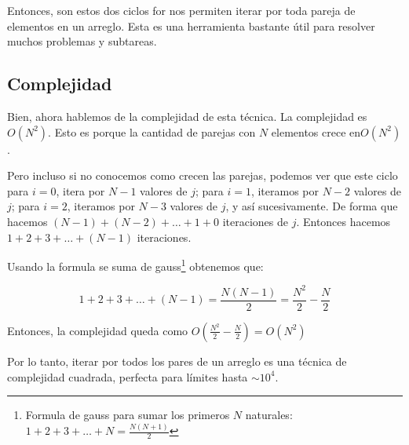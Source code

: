 Entonces, son estos dos ciclos for nos permiten iterar por toda pareja de elementos en un arreglo. Esta es una herramienta bastante útil para resolver muchos problemas y subtareas.

\subsection {Complejidad}
Bien, ahora hablemos de la complejidad de esta técnica. La complejidad es \(O(N^2)\). Esto es porque la cantidad de parejas con \(N\) elementos crece en\(O(N^2)\).

Pero incluso si no conocemos como crecen las parejas, podemos ver que este ciclo para \(i = 0\), itera por \(N-1\) valores de \(j\); para \(i=1\), iteramos por \(N-2\) valores de \(j\); para \(i=2\), iteramos por \(N-3\) valores de \(j\), y así sucesivamente. De forma que hacemos \((N-1)+(N-2)+\ldots+1+0\) iteraciones de \(j\). Entonces hacemos \(1+2+3+\ldots+(N-1)\) iteraciones.

Usando la formula se suma de gauss\footnote{Formula de gauss para sumar los primeros \(N\) naturales: \(1+2+3+\ldots+N=\frac{N(N+1)}{2}\)} obtenemos que:

\[1+2+3+\ldots+(N-1)=\frac{N(N-1)}{2}=\frac{N^2}{2}-\frac{N}{2}\]

Entonces, la complejidad queda como \(O(\frac{N^2}{2}-\frac{N}{2})=O(N^2)\)

Por lo tanto, iterar por todos los pares de un arreglo es una técnica de complejidad cuadrada, perfecta para límites hasta \(\sim{10^4}\).
